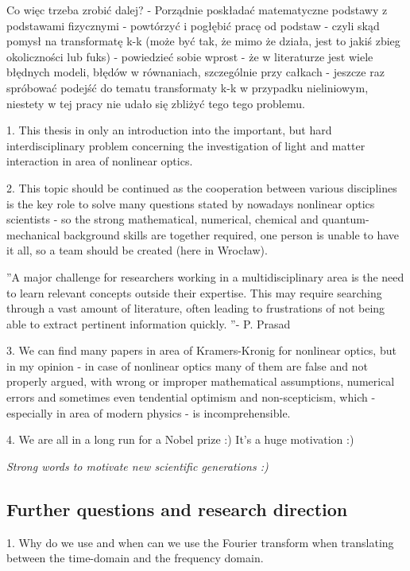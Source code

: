 \documentclass[12pt,twoside,a4paper]{article}
\numberwithin{equation}{subsection}
\numberwithin{figure}{subsection}
\begin{document}
Co więc trzeba zrobić dalej? 
- Porządnie poskładać matematyczne podstawy z podstawami fizycznymi - powtórzyć i pogłębić pracę od podstaw - czyli skąd pomysł
na transformatę k-k (może być tak, że mimo że działa, jest to jakiś zbieg okoliczności lub fuks) 
- powiedzieć sobie wprost - że w literaturze jest wiele błędnych modeli, błędów w równaniach, szczególnie przy całkach
- jeszcze raz spróbować podejść do tematu transformaty k-k w przypadku nieliniowym, niestety w tej pracy nie udało się zbliżyć tego
tego problemu.


1. This thesis in only an introduction into the important, but hard interdisciplinary problem concerning the investigation of light
and matter interaction in area of nonlinear optics. 

2. This topic should be continued as the cooperation between various disciplines is the key role to solve many questions stated
by nowadays nonlinear optics scientists - so the strong mathematical, numerical, chemical and quantum-mechanical background skills
are together required, one person is unable to have it all, so a team should be created (here in Wrocław).

''A major challenge for researchers working in a multidisciplinary area is the need to learn relevant concepts outside their
expertise. This may require searching through a vast amount of literature, often leading to frustrations of not being able to
extract pertinent information quickly. ''- P. Prasad \cite{prasad_nanophotonics}

3. We can find many papers in area of Kramers-Kronig for nonlinear optics, but in my opinion - in case of nonlinear optics many of
them are false and not properly argued, with wrong or improper mathematical assumptions, numerical errors and sometimes even
tendential optimism and non-scepticism, which - especially in area of modern physics - is incomprehensible.

4. We are all in a long run for a Nobel prize :) It's a huge motivation :)

\textit{Strong words to motivate new scientific generations :)}

\subsection{Further questions and research direction} \label{chap:conclusion_further}

1. Why do we use and when can we use the Fourier transform when translating between the time-domain and the frequency domain.
\end{document}
